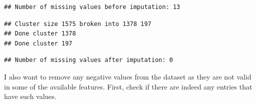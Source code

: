 \documentclass[
]{article}
\newenvironment{Shaded}{\begin{snugshade}}{\end{snugshade}}
\newcommand{\AttributeTok}[1]{\textcolor[rgb]{0.13,0.29,0.53}{#1}}
\newcommand{\DecValTok}[1]{\textcolor[rgb]{0.00,0.00,0.81}{#1}}
\newcommand{\FunctionTok}[1]{\textcolor[rgb]{0.13,0.29,0.53}{\textbf{#1}}}
\newcommand{\NormalTok}[1]{#1}
\newcommand{\OtherTok}[1]{\textcolor[rgb]{0.56,0.35,0.01}{#1}}
\newcommand{\SpecialCharTok}[1]{\textcolor[rgb]{0.81,0.36,0.00}{\textbf{#1}}}
\newcommand{\StringTok}[1]{\textcolor[rgb]{0.31,0.60,0.02}{#1}}
\begin{document}
\begin{Shaded}
\end{Shaded}

\begin{verbatim}
## Number of missing values before imputation: 13
\end{verbatim}

\begin{verbatim}
## Cluster size 1575 broken into 1378 197 
## Done cluster 1378 
## Done cluster 197
\end{verbatim}

\begin{verbatim}
## Number of missing values after imputation: 0
\end{verbatim}

\vspace{1cm}

I also want to remove any negative values from the dataset as they are
not valid in some of the available features. First, check if there are
indeed any entries that have such values.\newline \vspace{1cm}
\end{document}
